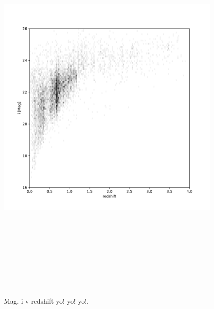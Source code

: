 \begin{figure}
    \centering
    \includegraphics[height=8in]{figures/mag_i_v_redshift.pdf}
    \caption{Mag. i v redshift yo! yo! yo!.}
    \label{fig:dp_mag_i_v_redshift}
\end{figure}


